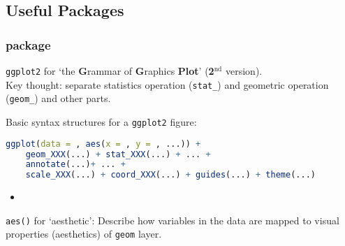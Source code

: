 \subsection{Useful Packages}

\subsubsection{ package}
    \lstinline|ggplot2| for `the \textbf{G}rammar of \textbf{G}raphics \textbf{Plot}' (\textbf{2}$^\mathrm{nd}$ version). \\
    Key thought: separate statistics operation (\lstinline|stat_|) and geometric operation (\lstinline|geom_|) and other parts.

    Basic syntax structures for a \lstinline|ggplot2| figure:
\begin{lstlisting}[language=R]
ggplot(data = , aes(x = , y = , ...)) +
    geom_XXX(...) + stat_XXX(...) + ... +
    annotate(...)+ ... +
    scale_XXX(...) + coord_XXX(...) + guides(...) + theme(...)    
\end{lstlisting}


\begin{itemize}[topsep=6pt,itemsep=4pt]
    \item 
\end{itemize}

    
\begin{point}
    \lstinline|aes()| for `aesthetic': Describe how variables in the data are mapped to visual properties (aesthetics) of \lstinline|geom| layer.
\end{point}



